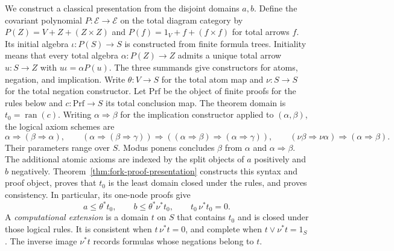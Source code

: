 \documentclass[11pt]{article}
\newcommand{\ran}{\operatorname{ran}}
\begin{document}
We construct a classical presentation from the disjoint domains $a,b$.
Define the covariant polynomial
$P:\mathcal E\to\mathcal E$ on the total diagram category by
$P(Z)=V+Z+(Z\times Z)$ and
$P(f)=1_V+f+(f\times f)$ for total arrows $f$.
Its initial algebra $\iota:P(S)\to S$ is constructed from finite
formula trees. Initiality means that every total algebra
$\alpha:P(Z)\to Z$ admits a unique total arrow $u:S\to Z$
with $u\iota=\alpha P(u)$.
The three summands give constructors for atoms, negation, and implication.
Write $\theta:V\to S$ for the total atom map
and $\nu:S\to S$ for the total negation constructor.
Let $\mathrm{Prf}$ be the object of finite proofs for the rules below
and $c:\mathrm{Prf}\to S$ its total conclusion map.
The theorem domain is $t_0=\ran(c)$.
Writing $\alpha\Rightarrow\beta$ for the implication constructor
applied to $(\alpha,\beta)$, the logical axiom schemes are
\[
 \alpha\Rightarrow(\beta\Rightarrow\alpha),\qquad
 (\alpha\Rightarrow(\beta\Rightarrow\gamma))
   \Rightarrow((\alpha\Rightarrow\beta)\Rightarrow
                         (\alpha\Rightarrow\gamma)),\qquad
 (\nu\beta\Rightarrow\nu\alpha)\Rightarrow(\alpha\Rightarrow\beta).
\]
Their parameters range over $S$. Modus ponens concludes $\beta$
from $\alpha$ and $\alpha\Rightarrow\beta$.
The additional atomic axioms are indexed by the split objects
of $a$ positively and $b$ negatively.
Theorem~\ref{thm:fork-proof-presentation} constructs this syntax and
proof object, proves that $t_0$ is the least domain closed under the
rules, and proves consistency. In particular, its one-node proofs give
\begin{equation}\label{eq:atomic-inequalities}
 a\le\theta^*t_0,\qquad
 b\le\theta^*\nu^*t_0,\qquad t_0\,\nu^*t_0=0.
\end{equation}
A \emph{computational extension} is a domain $t$ on $S$ that
contains $t_0$ and is closed under those logical rules.
It is consistent when $t\,\nu^*t=0$, and complete when
$t\vee\nu^*t=1_S$. The inverse image $\nu^*t$ records formulas
whose negations belong to $t$.
\end{document}
